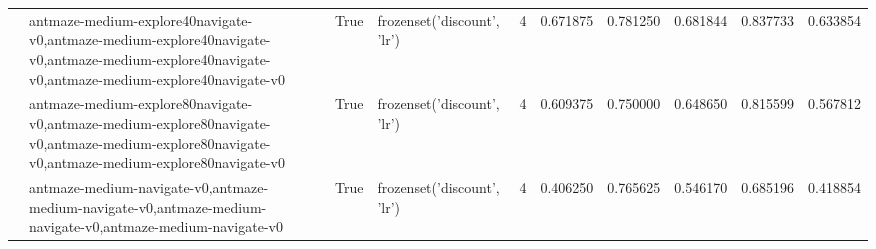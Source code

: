 \begin{tabular}{lllllrrrrr}
\cline{2-10} \cline{3-10} \cline{4-10}
 & antmaze-medium-explore40navigate-v0,antmaze-medium-explore40navigate-v0,antmaze-medium-explore40navigate-v0,antmaze-medium-explore40navigate-v0 & True & frozenset({'discount', 'lr'}) & 4 & 0.671875 & 0.781250 & 0.681844 & 0.837733 & 0.633854 \\
\cline{2-10} \cline{3-10} \cline{4-10}
 & antmaze-medium-explore80navigate-v0,antmaze-medium-explore80navigate-v0,antmaze-medium-explore80navigate-v0,antmaze-medium-explore80navigate-v0 & True & frozenset({'discount', 'lr'}) & 4 & 0.609375 & 0.750000 & 0.648650 & 0.815599 & 0.567812 \\
\cline{2-10} \cline{3-10} \cline{4-10}
 & antmaze-medium-navigate-v0,antmaze-medium-navigate-v0,antmaze-medium-navigate-v0,antmaze-medium-navigate-v0 & True & frozenset({'discount', 'lr'}) & 4 & 0.406250 & 0.765625 & 0.546170 & 0.685196 & 0.418854 \\
\cline{1-10} \cline{2-10} \cline{3-10} \cline{4-10}
\bottomrule
\end{tabular}
